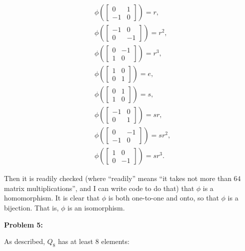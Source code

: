 \documentclass[a4paper,12pt]{article}
\newcommand{\shunt}{\vspace{20mm}}
\begin{document}
\begin{align*}
&\phi(\left[\begin{smallmatrix}0&1\\ -1&0 \end{smallmatrix}\right]) = r,\\
&\phi(\left[\begin{smallmatrix}-1&0\\ 0&-1 \end{smallmatrix}\right]) = r^2,\\
&\phi(\left[\begin{smallmatrix}0&-1\\ 1&0 \end{smallmatrix}\right]) = r^3,\\
&\phi(\left[\begin{smallmatrix}1&0\\ 0&1 \end{smallmatrix}\right]) = e,\\
&\phi(\left[\begin{smallmatrix}0&1\\ 1&0 \end{smallmatrix}\right]) = s,\\
&\phi(\left[\begin{smallmatrix}-1&0\\ 0&1 \end{smallmatrix}\right]) = sr,\\
&\phi(\left[\begin{smallmatrix}0&-1\\ -1&0 \end{smallmatrix}\right]) = sr^2,\\
&\phi(\left[\begin{smallmatrix}1&0\\ 0&-1 \end{smallmatrix}\right]) = sr^3.
\end{align*}

Then it is readily checked (where ``readily'' means ``it takes not more than $64$ matrix multiplications'', and I can write code to do that) that $\phi$ is a homomorphism. It is clear that $\phi$ is both one-to-one and onto, so that $\phi$ is a bijection. That is, $\phi$ is an isomorphism.

\shunt

{\bf Problem 5:}

As described, $Q_8$ has at least $8$ elements:
\end{document}

